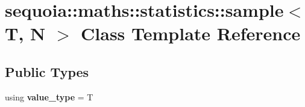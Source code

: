 \hypertarget{classsequoia_1_1maths_1_1statistics_1_1sample}{}\section{sequoia\+::maths\+::statistics\+::sample$<$ T, N $>$ Class Template Reference}
\label{classsequoia_1_1maths_1_1statistics_1_1sample}
\subsection*{Public Types}
\begin{DoxyCompactItemize}
\item 
\mbox{\label{classsequoia_1_1maths_1_1statistics_1_1sample_a95c85c98e88ea9e7d8c8195e980e009b}} 
using {\bfseries value\+\_\+type} = T
\end{DoxyCompactItemize}
